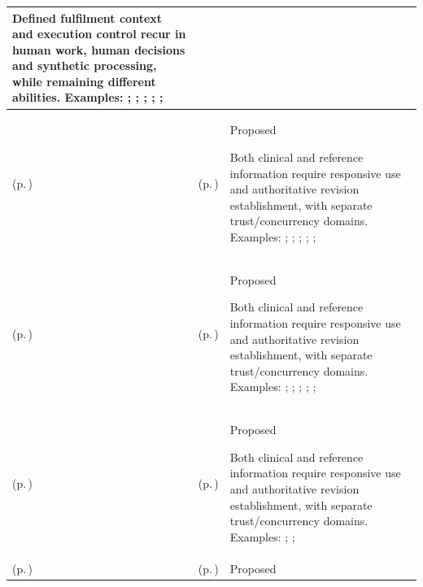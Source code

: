 \begin{longtable}{|>{\raggedright\arraybackslash}p{0.27\TableWidth}|>{\raggedright\arraybackslash}p{0.27\TableWidth}|>{\raggedright\arraybackslash}p{0.46\TableWidth}|}
Defined fulfilment context and execution control recur in human work, human decisions and synthetic processing, while remaining different abilities. Examples: \nameref{feature:feat-ise-20}; \nameref{feature:feat-ise-21}; \nameref{feature:feat-ise-22}; \nameref{feature:feat-ise-23}; \nameref{function:coordinate-work-order}; \nameref{service:work-order-coordination-service}\\\hline
\nameref{cap:bec-patient-clinical-record} (p.\,\pageref{cap:bec-patient-clinical-record}) & \nameref{cap:ec-active-information-availability} (p.\,\pageref{cap:ec-active-information-availability}) & Proposed

Both clinical and reference information require responsive use and authoritative revision establishment, with separate trust/concurrency domains. Examples: \nameref{feature:feat-ise-01}; \nameref{feature:feat-ise-02}; \nameref{feature:feat-ise-03}; \nameref{function:assemble-longitudinal-clinical-record}; \nameref{service:longitudinal-clinical-record-query}; \nameref{function:maintain-active-clinical-record}\\\hline
\nameref{cap:bec-patient-clinical-record} (p.\,\pageref{cap:bec-patient-clinical-record}) & \nameref{cap:ec-authoritative-durable-state-establishment} (p.\,\pageref{cap:ec-authoritative-durable-state-establishment}) & Proposed

Both clinical and reference information require responsive use and authoritative revision establishment, with separate trust/concurrency domains. Examples: \nameref{feature:feat-ise-01}; \nameref{feature:feat-ise-02}; \nameref{feature:feat-ise-03}; \nameref{function:assemble-longitudinal-clinical-record}; \nameref{service:longitudinal-clinical-record-query}; \nameref{function:maintain-active-clinical-record}\\\hline
\nameref{cap:bec-governed-reference-dataset-administration} (p.\,\pageref{cap:bec-governed-reference-dataset-administration}) & \nameref{cap:ec-active-information-availability} (p.\,\pageref{cap:ec-active-information-availability}) & Proposed

Both clinical and reference information require responsive use and authoritative revision establishment, with separate trust/concurrency domains. Examples: \nameref{feature:governed-dataset-content-revision}; \nameref{function:accept-governed-dataset-revision}; \nameref{service:governed-reference-dataset-content-query}\\\hline
\nameref{cap:bec-governed-reference-dataset-administration} (p.\,\pageref{cap:bec-governed-reference-dataset-administration}) & \nameref{cap:ec-authoritative-durable-state-establishment} (p.\,\pageref{cap:ec-authoritative-durable-state-establishment}) & Proposed


\end{longtable}
